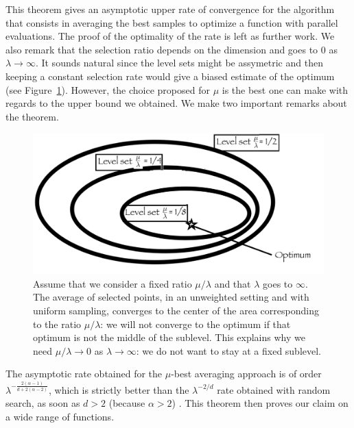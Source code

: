 This theorem gives an asymptotic upper rate of convergence for the algorithm that consists in averaging the best samples to optimize a function with parallel evaluations. The proof of the optimality of the rate is left as further work. We also remark that the selection ratio depends on the dimension and goes to $0$ as $\lambda\to\infty$. It sounds natural since the level sets might be assymetric and then keeping a constant selection rate would give a biased estimate of the optimum (see Figure~\ref{fig:levelset}). However, the choice proposed for $\mu$ is the best one can make with regards to the upper bound we obtained. We make two important remarks about the theorem.
\begin{figure}
\centering
	\includegraphics[width=.4\textwidth]{sections/appendix/foga2021-kbest/samples/joli.png}
	\caption{\label{zoli}Assume that we consider a fixed ratio $\mu/\lambda$ and that $\lambda$ goes to $\infty$. The average of selected points, in an unweighted setting and with uniform sampling, converges to the center of the area corresponding to the ratio $\mu/\lambda$: we will not converge to the optimum if that optimum is not the middle of the sublevel. This explains why we need $\mu/\lambda\to 0$ as $\lambda \to \infty$: we do not want to stay at a fixed sublevel. }
	\label{fig:levelset}
\end{figure}
\begin{rmq} The asymptotic
rate obtained for the $\mu$-best averaging approach is of order $\lambda^{-\frac{2(\alpha-1)}{d+2(\alpha-2)}}$,
which is strictly better than the $\lambda^{-2/d}$ rate obtained
with random search, as soon as $d>2$ (because $\alpha>2$) .
This theorem then proves our claim on a wide range of functions. 
\end{rmq}


